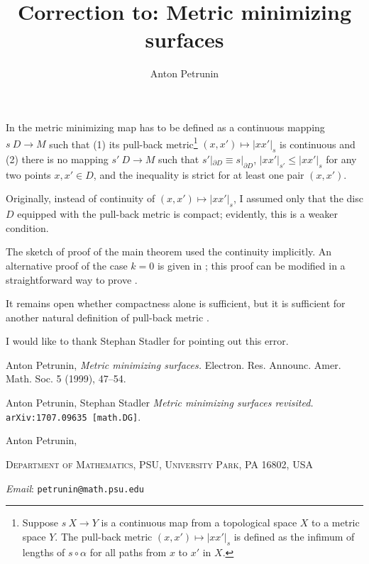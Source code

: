 \documentclass{article}
\begin{document}
\title{Correction to: Metric minimizing surfaces}
\author{Anton Petrunin}

\newcommand{\Addresses}{{\bigskip\footnotesize
Anton Petrunin, \par\nopagebreak\textsc{Department of Mathematics, PSU, University Park, PA 16802, USA}
\par\nopagebreak
\textit{Email}: \texttt{petrunin@math.psu.edu}
}}

\date{}

\maketitle



In \cite{petrunin-metric-min} the metric minimizing map has to be defined as 
a continuous mapping $s\: D \to M$ such that (1) its pull-back metric\footnote{Suppose $s\: X\to Y$ is a continuous map from a topological space $X$ to a metric space $Y$.
The pull-back metric $(x,x')\mapsto |xx'|_s$ is defined as the infimum of lengths of $s\circ\alpha$ for all paths from $x$ to $x'$ in $X$.} $(x,x')\mapsto |xx'|_s$ is continuous and (2) there is no mapping $s'\: D \to M$ such that
$s'|_{\partial D} \equiv s|_{\partial D}$, $|xx'|_{s'} \le |xx' |_s$ for any two points $x, x' \in D$, and the inequality is strict for at least one pair $(x,x')$.

Originally, instead of continuity of $(x,x')\mapsto |xx'|_s$, I assumed only that the disc $D$ equipped with the pull-back metric is compact;
evidently, this is a weaker condition.

The sketch of proof of the main theorem \cite[2.2]{petrunin-metric-min} used the continuity implicitly.
An alternative proof of the case $k=0$ is given in \cite[9.2]{petrunin-stadler};
this proof can be modified in a straightforward way to prove \cite[2.2]{petrunin-metric-min}.

It remains open whether compactness alone is sufficient,
but it is sufficient for another natural definition of pull-back metric \cite[9.1]{petrunin-stadler}.

I would like to thank Stephan Stadler for pointing out this error.

\begin{thebibliography}{52}

 Anton Petrunin,
\textit{Metric minimizing surfaces.}
Electron. Res. Announc. Amer. Math. Soc. 5 (1999), 47--54. 

 Anton Petrunin, Stephan Stadler
\textit{Metric minimizing surfaces revisited.} \texttt{arXiv:1707.09635 [math.DG]}.


\end{thebibliography}

\Addresses
\end{document}
